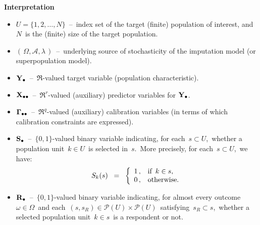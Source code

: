 \vskip 0.2cm
\noindent
\textbf{Interpretation}
\begin{itemize}
\item
    $U = \{1,2,\ldots,N\}$
    \,--\,
    index set of the target (finite) population of interest,
    and \,$N$\, is the (finite) size of the target population.
\item
    $\left(\,\Omega,\mathscr{A},\lambda\,\right)$
    \,--\,
    underlying source of stochasticity of the imputation model (or superpopulation model).
\item
    $\mathbf{Y}_{\bullet}$
    \,--\,
    $\Re$-valued target variable (population characteristic).
\item
    $\mathbf{X}_{\bullet\bullet}$
    \,--\,
    $\Re^{r}$-valued (auxiliary) predictor variables for $\mathbf{Y}_{\bullet}$.
\item
    $\mathbf{\Gamma}_{\bullet\bullet}$
    \,--\,
    $\Re^{q}$-valued (auxiliary) {\color{red}calibration variables}
    (in terms of which calibration constraints are expressed).
\item
    $\mathbf{S}_{\bullet}$
    \,--\,
    $\{0,1\}$-valued binary variable indicating, for each \,$s \subset U$,\,
    whether a population unit \,$k \in U$\, is selected in \,$s$.\,
    More precisely, for each \,$s \subset U$,\, we have:
    \begin{equation*}
    S_{k}(s)
    \;\; = \;\;
        \left\{\begin{array}{cl}
            1\,, & \textnormal{if \,$k \in s$},
            \\
            0\,, & \textnormal{otherwise}.
            \end{array}\right.
    \end{equation*}
\item
    $\mathbf{R}_{\bullet}$
    \,--\,
    $\{0,1\}$-valued binary variable indicating, for almost every outcome
    \,$\omega \in \Omega$\,
    and each
    \,$(s,s_{R}) \in \mathcal{P}(U) \times \mathcal{P}(U)$\,
    satisfying
    \,$s_{R} \subset s$,\,
    whether a selected population unit \,$ k \in s$\,
    is a respondent or not.
\end{itemize}

